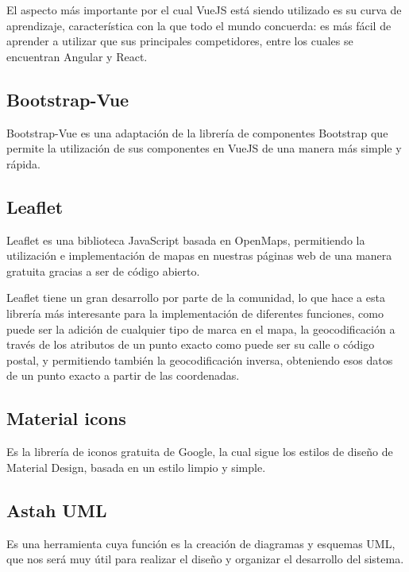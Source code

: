 El aspecto más importante por el cual VueJS está siendo utilizado es su curva de aprendizaje, característica con la que todo el mundo concuerda: es más fácil de aprender a utilizar que sus principales competidores, entre los cuales se encuentran Angular y React.~\cite{vue-curve}

    \subsection{Bootstrap-Vue}

Bootstrap-Vue es una adaptación de la librería de componentes Bootstrap que permite la utilización de sus componentes en VueJS de una manera más simple y rápida.~\cite{bootstrap-vue}

    \subsection{Leaflet}

Leaflet es una biblioteca JavaScript basada en OpenMaps, permitiendo la utilización e implementación de mapas en nuestras páginas web de una manera gratuita gracias a ser de código abierto.~\cite{leaflet}

Leaflet tiene un gran desarrollo por parte de la comunidad, lo que hace a esta librería más interesante para la implementación de diferentes funciones, como puede ser la adición de cualquier tipo de marca en el mapa, la geocodificación a través de los atributos de un punto exacto como puede ser su calle o código postal, y permitiendo también la geocodificación inversa, obteniendo esos datos de un punto exacto a partir de las coordenadas.

    \subsection{Material icons}

Es la librería de iconos gratuita de Google, la cual sigue los estilos de diseño de Material Design, basada en un estilo limpio y simple.

    \subsection{Astah UML}
Es una herramienta cuya función es la creación de diagramas y esquemas UML, que nos será muy útil para realizar el diseño y organizar el desarrollo del sistema.
